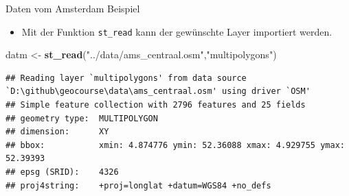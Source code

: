 \documentclass[ignorenonframetext,]{beamer}
\newenvironment{Shaded}{\begin{snugshade}}{\end{snugshade}}
\newcommand{\KeywordTok}[1]{\textcolor[rgb]{0.26,0.66,0.93}{\textbf{#1}}}
\newcommand{\NormalTok}[1]{\textcolor[rgb]{0.74,0.68,0.62}{#1}}
\newcommand{\StringTok}[1]{\textcolor[rgb]{0.02,0.61,0.04}{#1}}
\providecommand{\tightlist}{%
  \setlength{\itemsep}{0pt}\setlength{\parskip}{0pt}}
\begin{document}
\begin{frame}[fragile]{Daten vom Amsterdam Beispiel}
\protect\hypertarget{daten-vom-amsterdam-beispiel}{}

\begin{itemize}
\tightlist
\item
  Mit der Funktion \texttt{st\_read} kann der gewünschte Layer
  importiert werden.
\end{itemize}

\begin{Shaded}
\begin{Highlighting}[]
\NormalTok{datm <-}\StringTok{ }\KeywordTok{st_read}\NormalTok{(}\StringTok{"../data/ams_centraal.osm"}\NormalTok{,}\StringTok{"multipolygons"}\NormalTok{)}
\end{Highlighting}
\end{Shaded}

\begin{verbatim}
## Reading layer `multipolygons' from data source `D:\github\geocourse\data\ams_centraal.osm' using driver `OSM'
## Simple feature collection with 2796 features and 25 fields
## geometry type:  MULTIPOLYGON
## dimension:      XY
## bbox:           xmin: 4.874776 ymin: 52.36088 xmax: 4.929755 ymax: 52.39393
## epsg (SRID):    4326
## proj4string:    +proj=longlat +datum=WGS84 +no_defs
\end{verbatim}

\end{frame}
\end{document}
